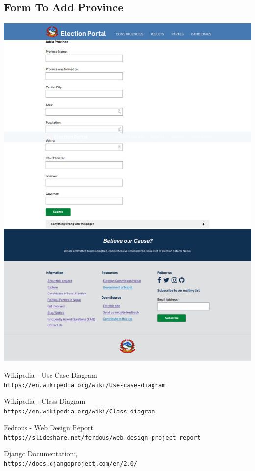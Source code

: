 \documentclass[12pt]{article}
\begin{document}
\subsection{Form To Add Province}
\begin{center}
\includegraphics[scale=0.25]{Form_To_Add_Province.png}
\end{center}





\begin{thebibliography}{9}
 
Wikipedia - Use Case Diagram
\\\texttt{https://en.wikipedia.org/wiki/Use-case-diagram}

Wikipedia - Class Diagram
\\\texttt{https://en.wikipedia.org/wiki/Class-diagram}

Fedrous - Web Design Report
\\\texttt{https://slideshare.net/ferdous/web-design-project-report}
 
Django Documentation:,
\\\texttt{https://docs.djangoproject.com/en/2.0/}
\end{thebibliography}
\end{document}
